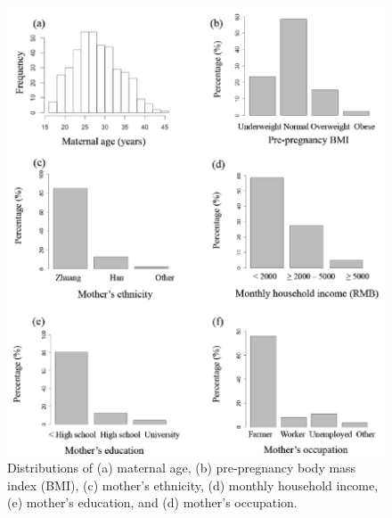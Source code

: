 \begin{figure}
  \centering
    \label{fig:Fig23}
  \includegraphics[scale=1]{Figures/Fig23.pdf}
  \caption[Distributions of (a) maternal age, (b) pre-pregnancy body mass index,
(c) mother's ethnicity, (d) monthly household income, (e) mother's education, and (d)
mother's occupation]{Distributions of (a) maternal age, (b) pre-pregnancy body mass index (BMI),
(c) mother's ethnicity, (d) monthly household income, (e) mother's education, and (d)
mother's occupation.}
\end{figure}

